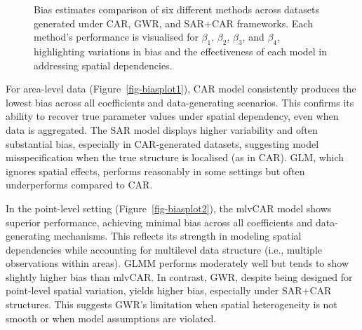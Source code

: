 \documentclass[
  default,
]{sn-jnl}
\begin{document}
\begin{figure}
\begin{minipage}{0.50\linewidth}
{}


\end{minipage}%

\caption{\label{fig-biasplot}Bias estimates comparison of six different
methods across datasets generated under CAR, GWR, and SAR+CAR
frameworks. Each method's performance is visualised for \(\beta_1\),
\(\beta_2\), \(\beta_3\), and \(\beta_4\), highlighting variations in
bias and the effectiveness of each model in addressing spatial
dependencies.}

\end{figure}%

For area-level data (Figure~\ref{fig-biasplot1}), CAR model consistently
produces the lowest bias across all coefficients and data-generating
scenarios. This confirms its ability to recover true parameter values
under spatial dependency, even when data is aggregated. The SAR model
displays higher variability and often substantial bias, especially in
CAR-generated datasets, suggesting model misspecification when the true
structure is localised (as in CAR). GLM, which ignores spatial effects,
performs reasonably in some settings but often underperforms compared to
CAR.

In the point-level setting (Figure~\ref{fig-biasplot2}), the mlvCAR
model shows superior performance, achieving minimal bias across all
coefficients and data-generating mechanisms. This reflects its strength
in modeling spatial dependencies while accounting for multilevel data
structure (i.e., multiple observations within areas). GLMM performs
moderately well but tends to show slightly higher bias than mlvCAR. In
contrast, GWR, despite being designed for point-level spatial variation,
yields higher bias, especially under SAR+CAR structures. This suggests
GWR's limitation when spatial heterogeneity is not smooth or when model
assumptions are violated.

\begingroup\fontsize{9}{11}\selectfont
\end{document}
